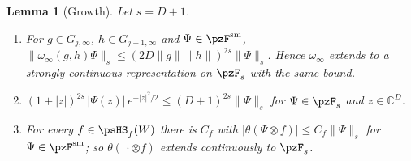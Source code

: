 \documentclass[10pt]{amsart}
\newtheorem{lemma}[theorem]{Lemma}
\theoremstyle{definition}
\theoremstyle{remark}
\newcommand{\C}{\mathbb C}
\begin{document}
\begin{lemma}[Growth]\label{pz:growth}
Let $s=D+1$.
\begin{enumerate}
\item[(a)] For $g\in G_{j,\infty}$, $h\in G_{j+1,\infty}$ and $\Psi\in\pzF^{\mathrm{sm}}$,
$\|\omega_\infty(g,h)\Psi\|_s\le(2D\|g\|\|h\|)^{2s}\|\Psi\|_s$. Hence $\omega_\infty$ extends to a
strongly continuous representation on $\pzF_s$ with the same bound.
\item[(b)] $(1+|z|)^{2s}\,|\Psi(z)|\,e^{-|z|^2/2}\le(D+1)^{2s}\|\Psi\|_s$ for $\Psi\in\pzF_s$ and
$z\in\C^D$.
\item[(c)] For every $f\in\psHS_f(W)$ there is $C_f$ with $|\theta(\Psi\otimes f)|\le C_f\|\Psi\|_s$
for $\Psi\in\pzF^{\mathrm{sm}}$; so $\theta(\,\cdot\otimes f)$ extends continuously to $\pzF_s$.
\end{enumerate}
\end{lemma}
\end{document}
